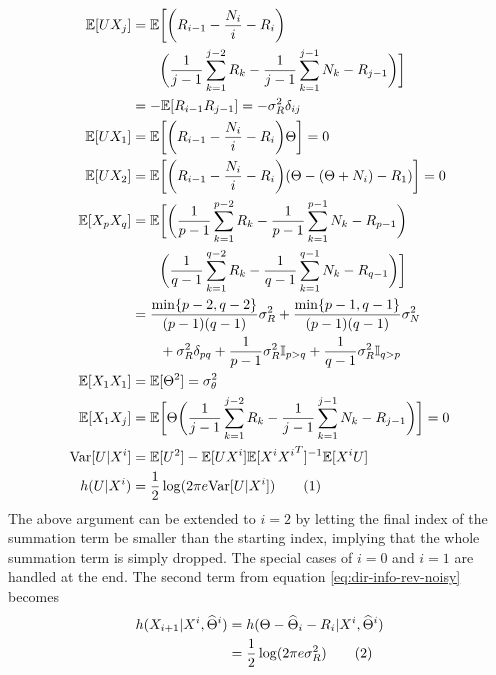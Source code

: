 \documentclass[conference]{IEEEtran}
\newcommand\numberthis{\stepcounter{equation}\tag{\theequation}}
\begin{document}
\begin{align*}
	\mathbb{E}[U X_j] &= \mathbb{E} \bigg[ \bigg( R_{i-1} - \frac{N_i}{i} - R_i \bigg) \\
					  & \qquad             \bigg( \frac{1}{j-1} \sum_{k=1}^{j-2} R_k - \frac{1}{j-1} \sum_{k=1}^{j-1} N_k - R_{j-1} \bigg) \bigg] \\
					  &= - \mathbb{E}[R_{i-1} R_{j-1}] = - \sigma_R^2 \delta_{ij} \\
	\mathbb{E}[U X_1] &= \mathbb{E} \bigg[ \bigg( R_{i-1} - \frac{N_i}{i} - R_i \bigg) \Theta \bigg] = 0 \; \\
	\mathbb{E}[U X_2] &= \mathbb{E} \bigg[ \bigg( R_{i-1} - \frac{N_i}{i} - R_i \bigg) (\Theta - (\Theta + N_i) - R_1) \bigg] = 0 \; \\
	\mathbb{E}[X_p X_q] &= \mathbb{E} \bigg[ \bigg( \frac{1}{p-1} \sum_{k=1}^{p-2} R_k - \frac{1}{p-1} \sum_{k=1}^{p-1} N_k - R_{p-1} \bigg) \\
						& \qquad             \bigg( \frac{1}{q-1} \sum_{k=1}^{q-2} R_k - \frac{1}{q-1} \sum_{k=1}^{q-1} N_k - R_{q-1} \bigg) \bigg] \\
					    &= \frac{\min\{p-2, q-2\}}{(p-1)(q-1)} \sigma_R^2 + \frac{\min\{p-1, q-1\}}{(p-1)(q-1)} \sigma_N^2 \\
						& \qquad + \sigma_R^2 \delta_{pq} + \frac{1}{p-1} \sigma_R^2 \mathbb{I}_{p>q} + \frac{1}{q-1} \sigma_R^2 \mathbb{I}_{q>p} \\
	\mathbb{E}[X_1 X_1] &= \mathbb{E}[\Theta^2] = \sigma_\theta^2 \\
	\mathbb{E}[X_1 X_j] &= \mathbb{E} \bigg[ \Theta \bigg( \frac{1}{j-1} \sum_{k=1}^{j-2} R_k - \frac{1}{j-1} \sum_{k=1}^{j-1} N_k - R_{j-1} \bigg) \bigg] = 0 \\
	\text{Var}[U|X^i] &= \mathbb{E}[U^2] - \mathbb{E}[U X^i] \mathbb{E}[X^i {X^i}^T]^{-1} \mathbb{E}[X^i U] \\
	h(U | X^i) &= \frac{1}{2}\log(2 \pi e \text{Var}[U | X^i]) \numberthis \label{eq:h_x_x-noisy}
\end{align*}
The above argument can be extended to $i=2$ by letting the final index of the summation term be smaller than the starting index, implying that the whole summation term is simply dropped. The special cases of $i=0$ and $i=1$ are handled at the end. The second term from equation \eqref{eq:dir-info-rev-noisy} becomes
\begin{align*}
	h(X_{i+1} | X^i, \widehat\Theta^i) &= h(\Theta - \widehat\Theta_i - R_i | X^i, \widehat\Theta^i) \\
									   &= \frac{1}{2}\log(2 \pi e \sigma_R^2) \numberthis \label{eq:h_x_x_theta-noisy}
\end{align*}
\end{document}

